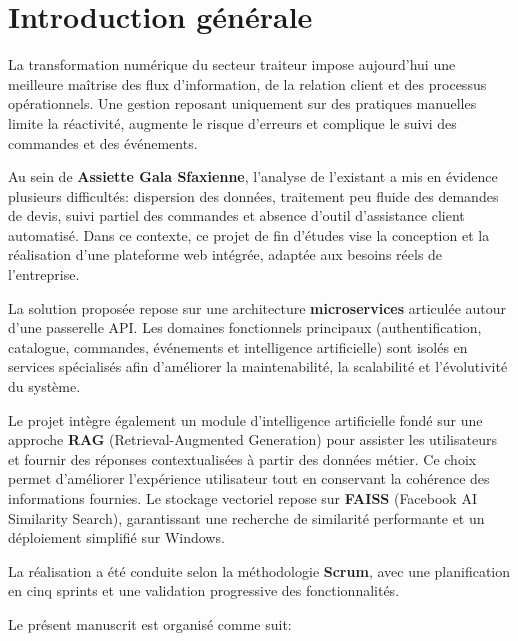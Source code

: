 \chapter*{\centering Introduction générale}

La transformation numérique du secteur traiteur impose aujourd'hui une meilleure maîtrise des flux d'information, de la relation client et des processus opérationnels. Une gestion reposant uniquement sur des pratiques manuelles limite la réactivité, augmente le risque d'erreurs et complique le suivi des commandes et des événements.

Au sein de \textbf{Assiette Gala Sfaxienne}, l'analyse de l'existant a mis en évidence plusieurs difficultés: dispersion des données, traitement peu fluide des demandes de devis, suivi partiel des commandes et absence d'outil d'assistance client automatisé. Dans ce contexte, ce projet de fin d'études vise la conception et la réalisation d'une plateforme web intégrée, adaptée aux besoins réels de l'entreprise.

La solution proposée repose sur une architecture \textbf{microservices} articulée autour d'une passerelle API. Les domaines fonctionnels principaux (authentification, catalogue, commandes, événements et intelligence artificielle) sont isolés en services spécialisés afin d'améliorer la maintenabilité, la scalabilité et l'évolutivité du système.

Le projet intègre également un module d'intelligence artificielle fondé sur une approche \textbf{RAG} (Retrieval-Augmented Generation) pour assister les utilisateurs et fournir des réponses contextualisées à partir des données métier. Ce choix permet d'améliorer l'expérience utilisateur tout en conservant la cohérence des informations fournies. Le stockage vectoriel repose sur \textbf{FAISS} (Facebook AI Similarity Search), garantissant une recherche de similarité performante et un déploiement simplifié sur Windows.

La réalisation a été conduite selon la méthodologie \textbf{Scrum}, avec une planification en cinq sprints et une validation progressive des fonctionnalités.

Le présent manuscrit est organisé comme suit:

